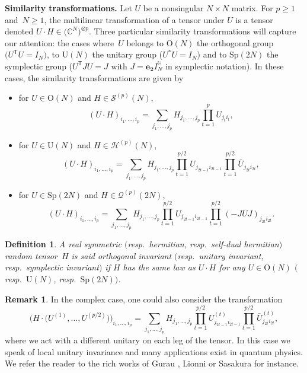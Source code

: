 \documentclass[pdftex]{sigma}
\numberwithin{equation}{section}
\theoremstyle{definition}
\newtheorem{Definition}[Theorem]{Definition}
\newtheorem{Remark}[Theorem]{Remark}
\begin{document}
{\bf Similarity transformations.}
Let $U$ be a nonsingular $N \times N$ matrix. For $p\geq 1$ and~${N \geq 1}$, the multilinear transformation of a tensor  under $U$ is a tensor denoted $U \cdot H \in \bigl(\mathbb{C}^{N}\bigr)^{\otimes p}$.
Three particular similarity transformations will capture our attention: the cases where~$U$ belongs to $\mathrm{O}(N)$ the orthogonal group $\bigl(U^{\mathsf T}U=I_N\bigr)$, to $\mathrm{U}(N)$ the unitary group \big(${U^*U=I_N}$\big) and to $\mathrm{Sp}(2N)$ the symplectic group \big(${U^{\mathsf T}JU=J}$ with $J=\mathbf{e_2}I^{\mathbb{H}}_N$ in symplectic notation\big). In these cases, the similarity transformations are given by
\begin{itemize}\itemsep=0pt
    \item[--] for $U \in \mathrm{O}(N)$ and $H \in \mathcal{S}^{(p)}(N)$, \[(U \cdot H)_{i_1,\dots,i_p}= \sum_{j_1,\dots,j_p} H_{j_1,\dots,j_p} \prod_{t=1}^p U_{j_t i_t},\]
    \item[--] for $U \in \mathrm{U}(N)$ and $H \in \mathcal{H}^{(p)}(N)$, \[(U \cdot H)_{i_1,\dots,i_p}=\sum_{j_1,\dots,j_p} H_{j_1,\dots,j_p} \prod_{t=1}^{p/2} U_{j_{2t-1} i_{2t-1}} \prod_{t=1}^{p/2} \bar U_{j_{2t} i_{2t}},\]
    \item[--] for $U \in \mathrm{Sp}(2N)$ and $H \in \mathcal{Q}^{(p)}(2N)$, \[(U \cdot H)_{i_1,\dots,i_p}=\sum_{j_1,\dots,j_p} H_{j_1,\dots,j_p} \prod_{t=1}^{p/2} U_{j_{2t-1} i_{2t-1}} \prod_{t=1}^{p/2} (-JUJ)_{j_{2t} i_{2t}}.\]
\end{itemize}

\begin{Definition}\label{def:tens_inv}
    \em A real symmetric $($resp.\ hermitian, resp.\ self-dual hermitian$)$ random tensor~$H$ is said {\em orthogonal invariant} $($resp.\ {\em unitary invariant}, resp.\ {\em symplectic invariant}$)$ if $H$ has the same law as $U \cdot H$ for any $U \in \mathrm{O}(N)$ $($resp.\ $\mathrm{U}(N)$, resp.\ $\mathrm{Sp}(2N))$.
\end{Definition}

\begin{Remark}
    In the complex case, one could also consider the transformation
    \[
    \bigl(H \cdot \bigl(U^{(1)},\dots,U^{(p/2)} \bigr)\bigr)_{i_1,\dots,i_p}=\sum_{j_1,\dots,j_p} H_{j_1,\dots,j_p} \prod_{t=1}^{p/2} U^{(t)}_{j_{2t-1} i_{2t-1}} \prod_{t=1}^{p/2} \bar U^{(t)}_{j_{2t} i_{2t}},
     \]
     where we act with a different unitary on each leg of the tensor. In this case we speak of local unitary invariance and many applications exist in quantum physics. We refer the reader to the rich works of Gurau \cite{guraubook}, Lionni \cite{lionnispringer} or Sasakura \cite{sasakurasigned} for instance.
\end{Remark}
\end{document}
